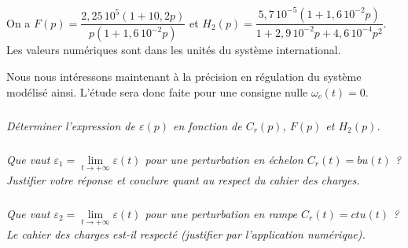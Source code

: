 \documentclass[10pt,fleqn]{article} %
\begin{document}
On a $F(p)=\dfrac{2,25\, 10^{5}\left(1+ 10,2 p\right)}{p\left(1+1,6\, 10^{-2}p\right)}$ et $H_2(p)=\dfrac{5,7\, 10^{-5}\left(1+ 1,6\, 10^{-2}p\right)}{1+2,9\, 10^{-2}p+4,6\, 10^{-4}p^2}$. Les valeurs numériques sont dans les unités du système international.


Nous nous intéressons maintenant à la précision en régulation du système modélisé ainsi. L'étude sera donc faite pour une consigne nulle $\omega_c(t) = 0$.

\subparagraph{}
\textit{Déterminer l'expression de $\varepsilon(p)$ en fonction de $C_r(p)$, $F(p)$ et $H_2(p)$.}

\subparagraph{}
\textit{Que vaut $\varepsilon_1 = \lim\limits_{t \to + \infty} \varepsilon(t)$ pour une perturbation en échelon $C_r(t)=bu(t)$ ? Justifier votre réponse et conclure quant au respect du cahier des charges.}

\subparagraph{}
\textit{Que vaut $\varepsilon_2 = \lim\limits_{t \to + \infty} \varepsilon(t)$ pour une perturbation en rampe $C_r(t)=c t u(t)$ ? Le cahier des charges est-il respecté (justifier par l'application numérique).}
\end{document}
